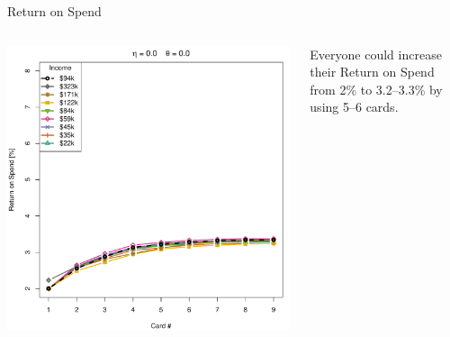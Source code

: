 \begin{frame}{Return on Spend}
    \begin{columns}[c]
        \begin{column}{0.7\textwidth}
            \includegraphics[width=0.9\textheight]{../Figures/ROSvsKvsIncome_0_0.pdf}
        \end{column}
        \begin{column}{0.3\textwidth}
            \centering
            Everyone could increase their Return on Spend from 2\% to 3.2--3.3\% by using 5--6 cards.
        \end{column}
    \end{columns}
\end{frame} 

